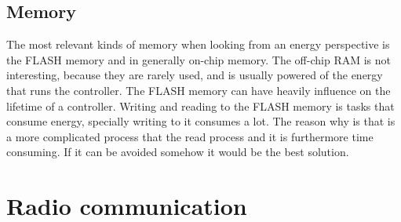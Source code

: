 \subsection{Memory}
 The most relevant kinds of memory when looking from an energy perspective is the FLASH memory and in generally on-chip memory. The off-chip RAM is not interesting, because they are rarely used, and is usually powered of the energy that runs the controller.
 The FLASH memory can have heavily influence on the lifetime of a controller. Writing and reading to the FLASH memory is tasks that consume energy, specially writing to it consumes a lot. The reason why is that is a more complicated process that the read process and it is furthermore time consuming.
 If it can be avoided somehow it would be the best solution.   
 
\section{Radio communication}